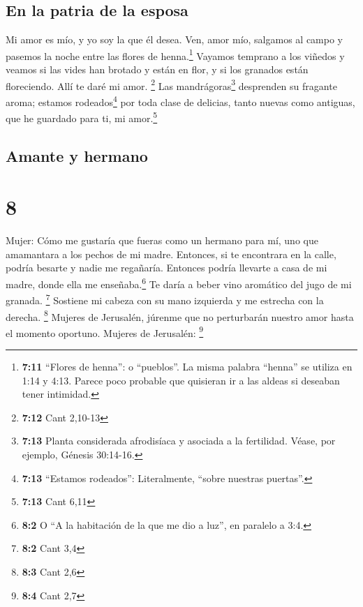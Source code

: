 \hypertarget{en-la-patria-de-la-esposa}{%
\subsection{En la patria de la esposa}\label{en-la-patria-de-la-esposa}}

 Mi amor es mío, y yo soy la que él desea.
 Ven, amor mío, salgamos al campo y pasemos la noche
entre las flores de henna.\footnote{\textbf{7:11} ``Flores de henna'': o
  ``pueblos''. La misma palabra ``henna'' se utiliza en 1:14 y 4:13.
  Parece poco probable que quisieran ir a las aldeas si deseaban tener
  intimidad.}  Vayamos temprano a los viñedos y veamos si
las vides han brotado y están en flor, y si los granados están
floreciendo. Allí te daré mi amor. \footnote{\textbf{7:12} Cant 2,10-13}
 Las mandrágoras\footnote{\textbf{7:13} Planta
  considerada afrodisíaca y asociada a la fertilidad. Véase, por
  ejemplo, Génesis 30:14-16.} desprenden su fragante aroma; estamos
rodeados\footnote{\textbf{7:13} ``Estamos rodeados'': Literalmente,
  ``sobre nuestras puertas''.} por toda clase de delicias, tanto nuevas
como antiguas, que he guardado para ti, mi amor.\footnote{\textbf{7:13}
  Cant 6,11}

\hypertarget{amante-y-hermano}{%
\subsection{Amante y hermano}\label{amante-y-hermano}}

\hypertarget{section-7}{%
\section{8}\label{section-7}}

Mujer:  Cómo me gustaría que fueras como un hermano para
mí, uno que amamantara a los pechos de mi madre. Entonces, si te
encontrara en la calle, podría besarte y nadie me regañaría.
 Entonces podría llevarte a casa de mi madre, donde ella
me enseñaba.\footnote{\textbf{8:2} O ``A la habitación de la que me dio
  a luz'', en paralelo a 3:4.} Te daría a beber vino aromático del jugo
de mi granada. \footnote{\textbf{8:2} Cant 3,4}  Sostiene
mi cabeza con su mano izquierda y me estrecha con la derecha.
\footnote{\textbf{8:3} Cant 2,6}  Mujeres de Jerusalén,
júrenme que no perturbarán nuestro amor hasta el momento oportuno.
Mujeres de Jerusalén: \footnote{\textbf{8:4} Cant 2,7}

